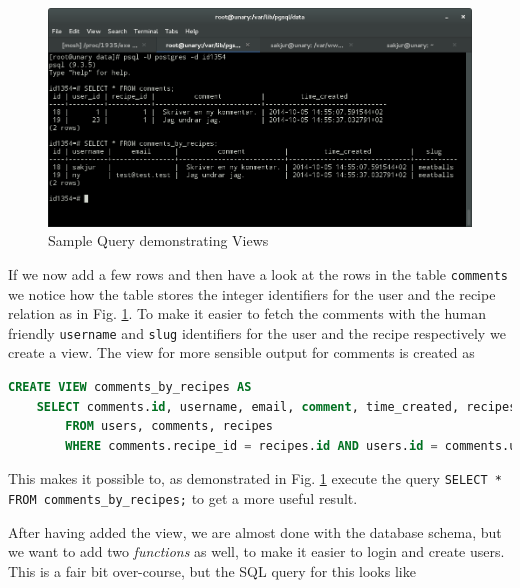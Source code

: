 \documentclass[a4paper]{scrartcl}
\begin{document}
\begin{figure}[!h]
  \begin{center}
    \includegraphics[scale=0.3]{select.png}
    \caption{Sample Query demonstrating Views}
    \label{fig:samquery}
  \end{center}
\end{figure}

If we now add a few rows and then have a look at the rows in the table \texttt{comments} we notice how the table stores the integer identifiers for the user and the recipe relation as in Fig. \ref{fig:samquery}. To make it easier to fetch the comments with the human friendly \texttt{username} and \texttt{slug} identifiers for the user and the recipe respectively we create a view. The view for more sensible output for comments is created as

\begin{lstlisting}[language=SQL]
CREATE VIEW comments_by_recipes AS
	SELECT comments.id, username, email, comment, time_created, recipes.slug
		FROM users, comments, recipes
		WHERE comments.recipe_id = recipes.id AND users.id = comments.user_id;
\end{lstlisting}

This makes it possible to, as demonstrated in Fig. \ref{fig:samquery} execute the query \texttt{SELECT * FROM comments\_by\_recipes;} to get a more useful result.

After having added the view, we are almost done with the database schema, but we want to add two \textit{functions} as well, to make it easier to login and create users. This is a fair bit over-course, but the SQL query for this looks like 
\end{document}
